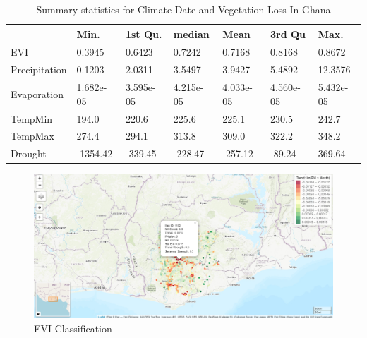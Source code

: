 \begin{table}[]
	\label{table:Summary Statistics}
	\caption{Summary statistics for Climate Date and Vegetation Loss In Ghana}
	\centering
	\begin{tabularx}{\textwidth}{|l*{3}{X|}*{3}{X|}}
		\toprule
		                   & Min.      & 1st Qu. & median   & Mean     & 3rd Qu   & Max.  \\ \midrule
		EVI                &   0.3945  & 0.6423  & 0.7242   & 0.7168   & 0.8168   &0.8672 \\
		Precipitation      &   0.1203  & 2.0311  & 3.5497   &  3.9427  & 5.4892   &12.3576 \\
		Evaporation        & 1.682e-05 &3.595e-05&4.215e-05 &4.033e-05 & 4.560e-05&5.432e-05 \\
		TempMin            &   194.0   & 220.6   & 225.6    & 225.1    & 230.5    &242.7 \\
		TempMax            &   274.4   & 294.1   & 313.8    & 309.0    &  322.2   &348.2 \\ 
		Drought            &  -1354.42 & -339.45 & -228.47  &-257.12   & -89.24   &369.64 \\ \bottomrule
	\end{tabularx}
\end{table}
\begin{figure}
	\centering
	\includegraphics[width=0.9\linewidth]{images/Map}
	\caption{EVI Classification}
	\label{fig:map}
\end{figure}


